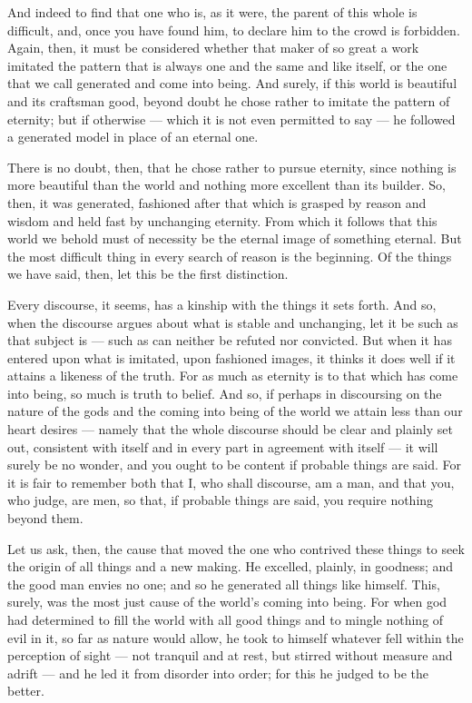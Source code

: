  And indeed to find that one who is, as it were, the parent of this whole is difficult, and, once you have found him, to declare him to the crowd is forbidden. Again, then, it must be considered whether that maker of so great a work imitated the pattern that is always one and the same and like itself, or the one that we call generated and come into being. And surely, if this world is beautiful and its craftsman good, beyond doubt he chose rather to imitate the pattern of eternity; but if otherwise — which it is not even permitted to say — he followed a generated model in place of an eternal one.

 There is no doubt, then, that he chose rather to pursue eternity, since nothing is more beautiful than the world and nothing more excellent than its builder. So, then, it was generated, fashioned after that which is grasped by reason and wisdom and held fast by unchanging eternity. From which it follows that this world we behold must of necessity be the eternal image of something eternal. But the most difficult thing in every search of reason is the beginning. Of the things we have said, then, let this be the first distinction.

 Every discourse, it seems, has a kinship with the things it sets forth. And so, when the discourse argues about what is stable and unchanging, let it be such as that subject is — such as can neither be refuted nor convicted. But when it has entered upon what is imitated, upon fashioned images, it thinks it does well if it attains a likeness of the truth. For as much as eternity is to that which has come into being, so much is truth to belief. And so, if perhaps in discoursing on the nature of the gods and the coming into being of the world we attain less than our heart desires — namely that the whole discourse should be clear and plainly set out, consistent with itself and in every part in agreement with itself — it will surely be no wonder, and you ought to be content if probable things are said. For it is fair to remember both that I, who shall discourse, am a man, and that you, who judge, are men, so that, if probable things are said, you require nothing beyond them.

 Let us ask, then, the cause that moved the one who contrived these things to seek the origin of all things and a new making. He excelled, plainly, in goodness; and the good man envies no one; and so he generated all things like himself. This, surely, was the most just cause of the world's coming into being. For when god had determined to fill the world with all good things and to mingle nothing of evil in it, so far as nature would allow, he took to himself whatever fell within the perception of sight — not tranquil and at rest, but stirred without measure and adrift — and he led it from disorder into order; for this he judged to be the better.

